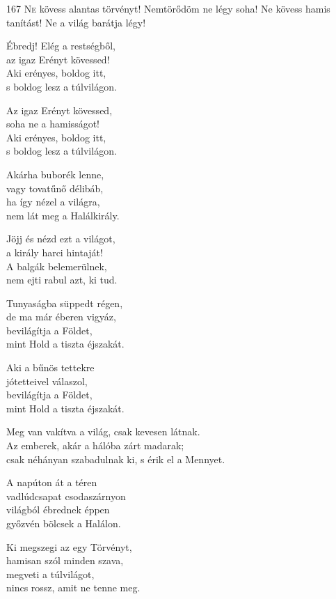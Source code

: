 
\begin{firstdhpverse}[-2pt]{167}
\lettrine{N}{e} {\LettrineTextFont kövess alantas törvényt!}\newline
Nemtörődöm ne légy soha!\newline
Ne kövess hamis tanítást!\newline
Ne a világ barátja légy!
\end{firstdhpverse}

\begin{dhpverse}

 Ébredj! Elég a restségből,\\
az igaz Erényt kövessed!\\
Aki erényes, boldog itt,\\
s boldog lesz a túlvilágon.

 Az igaz Erényt kövessed,\\
soha ne a hamisságot!\\
Aki erényes, boldog itt,\\
s boldog lesz a túlvilágon.

 Akárha buborék lenne,\\
vagy tovatűnő délibáb,\\
ha így nézel a világra,\\
nem lát meg a Halálkirály.

\end{dhpverse}
\newpage
\begin{dhpverse}

 Jöjj és nézd ezt a világot,\\
a király harci hintaját!\\
A balgák belemerülnek,\\
nem ejti rabul azt, ki tud.

 Tunyaságba süppedt régen,\\
de ma már éberen vigyáz,\\
bevilágítja a Földet,\\
mint Hold a tiszta éjszakát.

 Aki a bűnös tettekre\\
jótetteivel válaszol,\\
bevilágítja a Földet,\\
mint Hold a tiszta éjszakát.

 Meg van vakítva a világ, csak kevesen látnak.\\
Az emberek, akár a hálóba zárt madarak;\\
csak néhányan szabadulnak ki, s érik el a Mennyet.

 A napúton át a téren\\
vadlúdcsapat csodaszárnyon\\
világból ébrednek éppen\\
győzvén bölcsek a Halálon.

 Ki megszegi az egy Törvényt,\\
hamisan szól minden szava,\\
megveti a túlvilágot,\\
nincs rossz, amit ne tenne meg.

\end{dhpverse}
